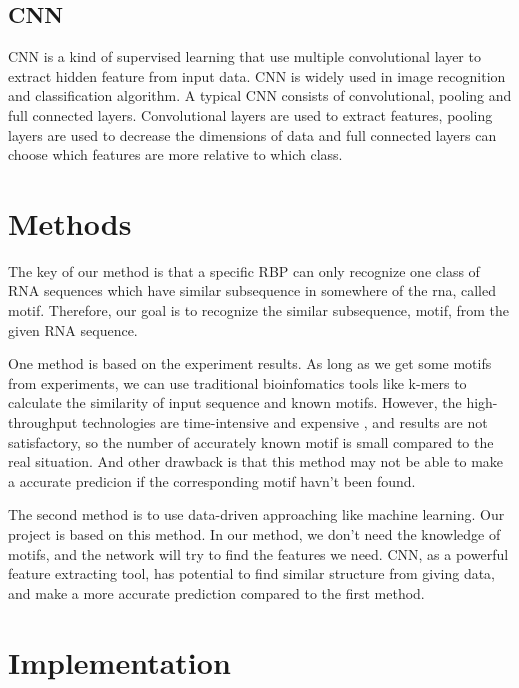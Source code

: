 \documentclass[twoside,twocolumn]{article}
\begin{document}
    \subsection{CNN}
    
    CNN is a kind of supervised learning that use multiple convolutional layer to extract hidden feature from input data. CNN is widely used in image recognition and classification algorithm. A typical CNN consists of convolutional, pooling and full connected layers. Convolutional layers are used to extract features, pooling layers are used to decrease the dimensions of data and full connected layers can choose which features are more relative to which class.
    
\section{Methods}

The key of our method is that a specific RBP can only recognize one class of RNA sequences which have similar subsequence in somewhere of the rna, called motif. Therefore, our goal is to recognize the similar subsequence, motif, from the given RNA sequence. 

One method is based on the experiment results. As long as we get some motifs from experiments, we can use traditional bioinfomatics tools like k-mers to calculate the similarity of input sequence and known motifs. However, the high-throughput technologies are time-intensive and expensive \cite{ref1}, and results are not satisfactory, so the number of accurately known motif is small compared to the real situation. And other drawback is that this method may not be able to make a accurate predicion if the corresponding motif havn't been found.

The second method is to use data-driven approaching like machine learning. Our project is based on this method. In our method, we don't need the knowledge of motifs, and the network will try to find the features we need. CNN, as a powerful feature extracting tool, has potential to find similar structure from giving data, and make a more accurate prediction compared to the first method.
\section{Implementation}
\end{document}
